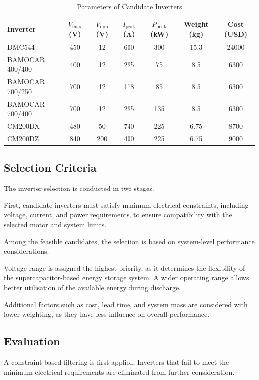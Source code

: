 \documentclass[11pt, a4paper]{report}
\numberwithin{equation}{section}
\begin{document}
\begin{table}[H]
\centering
\caption{Parameters of Candidate Inverters}
\label{tab:inverter_parameters}
\begin{tabular}{lcccccc}
\toprule
Inverter & $V_{\text{max}}$ (V) & $V_{\text{min}}$ (V) & $I_{\text{peak}}$ (A) & $P_{\text{peak}}$ (kW) & Weight (kg) & Cost (USD) \\
\midrule
DMC544 & 450 & 12 & 600 & 300 & 15.3 & 24000 \\
BAMOCAR 400/400 & 400 & 12 & 285 & 75 & 8.5 & 6300 \\
BAMOCAR 700/250 & 700 & 12 & 178 & 85 & 8.5 & 6300 \\
BAMOCAR 700/400 & 700 & 12 & 285 & 135 & 8.5 & 6300 \\
CM200DX & 480 & 50 & 740 & 225 & 6.75 & 8700 \\
CM200DZ & 840 & 200 & 400 & 225 & 6.75 & 9000 \\
\bottomrule
\end{tabular}
\end{table}

\subsection{Selection Criteria}

The inverter selection is conducted in two stages.

First, candidate inverters must satisfy minimum electrical constraints, including voltage, current, and power requirements, to ensure compatibility with the selected motor and system limits.

Among the feasible candidates, the selection is based on system-level performance considerations.

Voltage range is assigned the highest priority, as it determines the flexibility of the supercapacitor-based energy storage system. A wider operating range allows better utilisation of the available energy during discharge.

Additional factors such as cost, lead time, and system mass are considered with lower weighting, as they have less influence on overall performance.

\subsection{Evaluation}

A constraint-based filtering is first applied. Inverters that fail to meet the minimum electrical requirements are eliminated from further consideration.
\end{document}
